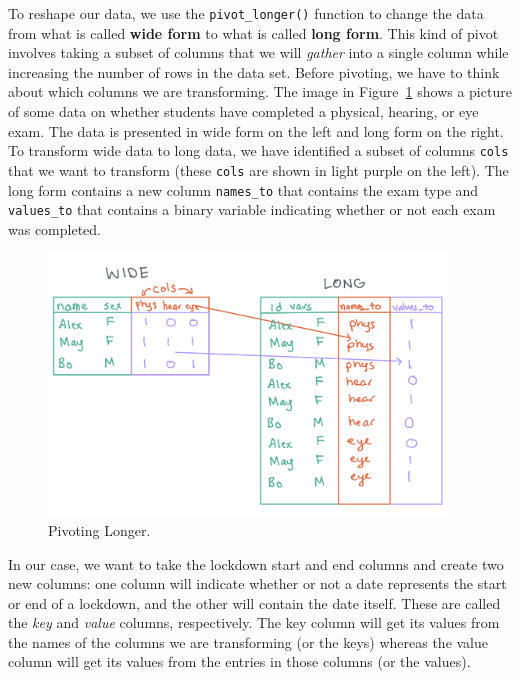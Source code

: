 \documentclass[
  letterpaper,
]{krantz}
\begin{document}
To reshape our data, we use the \texttt{pivot\_longer()} function to
change the data from what is called \textbf{wide form} to what is called
\textbf{long form}. This kind of pivot involves taking a subset of
columns that we will \emph{gather} into a single column while increasing
the number of rows in the data set. Before pivoting, we have to think
about which columns we are transforming. The image in
Figure~\ref{fig-pivot-long} shows a picture of some data on whether
students have completed a physical, hearing, or eye exam. The data is
presented in wide form on the left and long form on the right. To
transform wide data to long data, we have identified a subset of columns
\texttt{cols} that we want to transform (these \texttt{cols} are shown
in light purple on the left). The long form contains a new column
\texttt{names\_to} that contains the exam type and \texttt{values\_to}
that contains a binary variable indicating whether or not each exam was
completed.

\begin{figure}

{\centering \includegraphics[width=4.16667in,height=\textheight]{book/images/6-pivot-long.png}

}

\caption{\label{fig-pivot-long}Pivoting Longer.}

\end{figure}

In our case, we want to take the lockdown start and end columns and
create two new columns: one column will indicate whether or not a date
represents the start or end of a lockdown, and the other will contain
the date itself. These are called the \emph{key} and \emph{value}
columns, respectively. The key column will get its values from the names
of the columns we are transforming (or the keys) whereas the value
column will get its values from the entries in those columns (or the
values).
\end{document}
